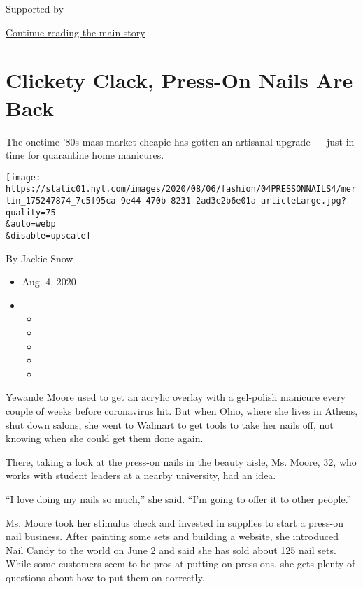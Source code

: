 Supported by

\protect\hyperlink{after-sponsor}{Continue reading the main story}

\hypertarget{clickety-clack-press-on-nails-are-back}{%
\section{Clickety Clack, Press-On Nails Are
Back}\label{clickety-clack-press-on-nails-are-back}}

The onetime '80s mass-market cheapie has gotten an artisanal upgrade ---
just in time for quarantine home manicures.

\texttt{[image: https://static01.nyt.com/images/2020/08/06/fashion/04PRESSONNAILS4/merlin\_175247874\_7c5f95ca-9e44-470b-8231-2ad3e2b6e01a-articleLarge.jpg?quality=75\\\&auto=webp\\\&disable=upscale]}

By Jackie Snow

\begin{itemize}
\item
  Aug. 4, 2020
\item
  \begin{itemize}
  \item
  \item
  \item
  \item
  \item
  \end{itemize}
\end{itemize}

Yewande Moore used to get an acrylic overlay with a gel-polish manicure
every couple of weeks before coronavirus hit. But when Ohio, where she
lives in Athens, shut down salons, she went to Walmart to get tools to
take her nails off, not knowing when she could get them done again.

There, taking a look at the press-on nails in the beauty aisle, Ms.
Moore, 32, who works with student leaders at a nearby university, had an
idea.

``I love doing my nails so much,'' she said. ``I'm going to offer it to
other people.''

Ms. Moore took her stimulus check and invested in supplies to start a
press-on nail business. After painting some sets and building a website,
she introduced \href{https://nailcandypressons.squarespace.com/}{Nail
Candy} to the world on June 2 and said she has sold about 125 nail sets.
While some customers seem to be pros at putting on press-ons, she gets
plenty of questions about how to put them on correctly.

